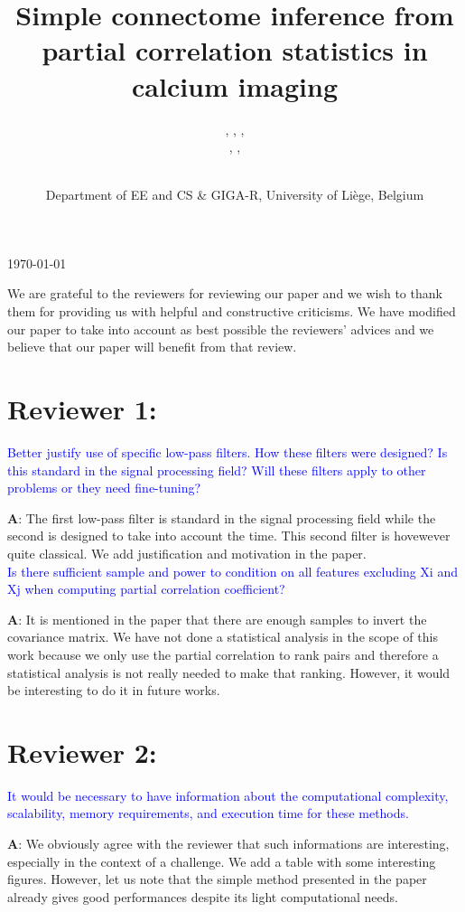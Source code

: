 \documentclass[wcp]{jmlr}
\title{Simple connectome inference from partial correlation statistics in calcium imaging}
\author{\Name{Antonio Sutera},
   \Name{Arnaud Joly},
   \Name{Vincent François-Lavet}, \Email{a.sutera@ulg.ac.be}\\
   \Name{Zixiao Aaron Qiu},
   \Name{Gilles Louppe},
   \Name{Damien Ernst}\and\Name{Pierre Geurts}
    \\
   \addr Department of EE and CS \& GIGA-R, University of Li\`ege, Belgium}
\begin{document}
\maketitle
\begin{center}
\vspace{-1.5cm}
\today
\end{center}

We are grateful to the reviewers for reviewing our paper and we wish to thank them for providing us with helpful and constructive criticisms.
We have modified our paper to take into account as best possible the reviewers' advices and we believe that our paper will benefit from that review. 


\section*{Reviewer 1:}
\textcolor{blue}{
Better justify use of specific low-pass filters. How these filters were designed? Is this standard in the signal processing field? Will these filters apply to other problems or they need fine-tuning?}

\textbf{A}: The first low-pass filter is standard in the signal processing field while the second is designed to take into account the time. This second filter is hovewever quite classical. We add justification and motivation in the paper.\\

\noindent
\textcolor{blue}{Is there sufficient sample and power to condition on all features excluding Xi and Xj when computing partial correlation coefficient?}

\textbf{A}: It is mentioned in the paper that there are enough samples to invert the covariance matrix. We have not done a statistical analysis in the scope of this work because we only use the partial correlation to rank pairs and therefore a statistical analysis is not really needed to make that ranking. However, it would be interesting to do it in future works.

\section*{Reviewer 2:}

\textcolor{blue}{It would be necessary to have information about the computational complexity, scalability, memory requirements, and execution time for these methods.}

\textbf{A}: We obviously agree with the reviewer that such informations are interesting, especially in the context of a challenge. We add a table with some interesting figures. However, let us note that the simple method presented in the paper already gives good performances despite its light computational needs.
\end{document}
